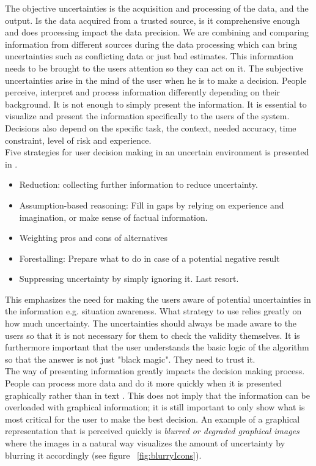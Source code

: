 The objective uncertainties is the acquisition and processing of the data, and the output. Is the data acquired from a trusted source, is it comprehensive enough and does processing impact the data precision. We are combining and comparing information from different sources during the data processing which can bring uncertainties such as conflicting data or just bad estimates. This information needs to be brought to the users attention so they can act on it. The subjective uncertainties arise in the mind of the user when he is to make a decision. People perceive, interpret and process information differently depending on their background. It is not enough to simply present the information. It is essential to visualize and present the information specifically to the users of the system. Decisions also depend on the specific task, the context, needed accuracy, time constraint, level of risk and experience. 
\\[0.5cm]
Five strategies for user decision making in an uncertain environment is presented in \cite{UncertainInformation}. 
\begin{itemize}
\item Reduction: collecting further information to reduce uncertainty.
\item Assumption-based reasoning: Fill in gaps by relying on experience and imagination, or make sense of factual information.
\item Weighting pros and cons of alternatives
\item Forestalling: Prepare what to do in case of a potential negative result
\item Suppressing uncertainty by simply ignoring it. Last resort.
\end{itemize}  
This emphasizes the need for making the users aware of potential uncertainties in the information e.g. situation awareness. What strategy to use relies greatly on how much uncertainty. The uncertainties should always be made aware to the users so that it is not necessary for them to check the validity themselves. It is furthermore important that the user understands the basic logic of the algorithm so that the answer is not just "black magic". They need to trust it.
\\[0.5cm]
The way of presenting information greatly impacts the decision making process. People can process more data and do it more quickly when it is presented graphically rather than in text \cite{UncertainInformation}. This does not imply that the information can be overloaded with graphical information; it is still important to only show what is most critical for the user to make the best decision. An example of a graphical representation that is perceived quickly is \textit{blurred or degraded graphical images} where the images in a natural way visualizes the amount of uncertainty by blurring it accordingly (see figure ~\ref{fig:blurryIcons}). 
